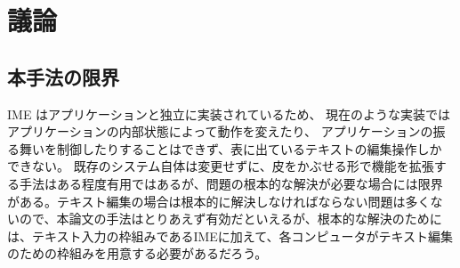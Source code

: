 \section{議論}


\subsection{本手法の限界}

IME はアプリケーションと独立に実装されているため、
現在のような実装ではアプリケーションの内部状態によって動作を変えたり、
アプリケーションの振る舞いを制御したりすることはできず、表に出ているテキストの編集操作しか
できない。 既存のシステム自体は変更せずに、皮をかぶせる形で機能を拡張す
る手法はある程度有用ではあるが、問題の根本的な解決が必要な場合には限界
がある。テキスト編集の場合は根本的に解決しなければならない問題は多くな
いので、本論文の手法はとりあえず有効だといえるが、根本的な解決のために
は、テキスト入力の枠組みであるIMEに加えて、各コンピュータがテキスト編集
のための枠組みを用意する必要があるだろう。
